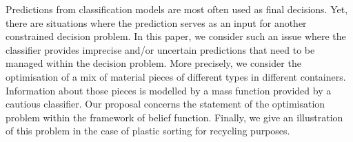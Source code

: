 

Predictions from classification models are most often used as final decisions. Yet, there are situations where the prediction serves as an input for another constrained decision problem. In this paper, we consider such an issue where the classifier provides imprecise and/or uncertain predictions that need to be managed within the decision problem. More precisely, we consider the optimisation of a mix of material pieces of different types in different containers. Information about those pieces is modelled by a mass function provided by a cautious classifier. Our proposal concerns the statement of the optimisation problem within the framework of belief function. Finally, we give an illustration of this problem in the case of plastic sorting for recycling purposes.


